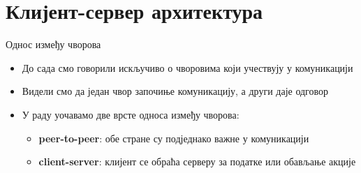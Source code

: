 \documentclass{beamer}
\begin{document}
    \section{Клијент-сервер архитектура}
    
    \begin{frame}{Однос између чворова}
        \begin{itemize}
            \item До сада смо говорили искључиво о чворовима који учествују у комуникацији
            \item Видели смо да један чвор започиње комуникацију, а други даје одговор
            \item У раду уочавамо две врсте односа између чворова:
            \begin{itemize}
                \item \textbf{peer-to-peer}: обе стране су подједнако важне у комуникацији
                \item \textbf{client-server}: клијент се обраћа серверу за податке или обављање акције
            \end{itemize}
        \end{itemize}
    \end{frame}
    
\end{document}

